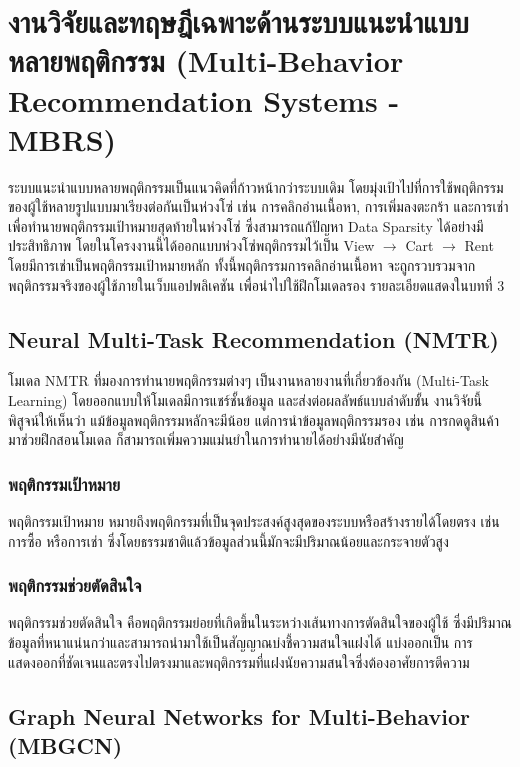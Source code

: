 \section{งานวิจัยและทฤษฎีเฉพาะด้านระบบแนะนำแบบหลายพฤติกรรม (Multi-Behavior Recommendation Systems - MBRS)}

ระบบแนะนำแบบหลายพฤติกรรมเป็นแนวคิดที่ก้าวหน้ากว่าระบบเดิม โดยมุ่งเป้าไปที่การใช้พฤติกรรมของผู้ใช้หลายรูปแบบมาเรียงต่อกันเป็นห่วงโซ่ เช่น การคลิกอ่านเนื้อหา, การเพิ่มลงตะกร้า และการเช่า เพื่อทำนายพฤติกรรมเป้าหมายสุดท้ายในห่วงโซ่ ซึ่งสามารถแก้ปัญหา Data Sparsity ได้อย่างมีประสิทธิภาพ โดยในโครงงานนี้ได้ออกแบบห่วงโซ่พฤติกรรมไว้เป็น View $\rightarrow$ Cart $\rightarrow$ Rent โดยมีการเช่าเป็นพฤติกรรมเป้าหมายหลัก ทั้งนี้พฤติกรรมการคลิกอ่านเนื้อหา จะถูกรวบรวมจากพฤติกรรมจริงของผู้ใช้ภายในเว็บแอปพลิเคชัน เพื่อนำไปใช้ฝึกโมเดลรอง รายละเอียดแสดงในบทที่ 3

\subsection{Neural Multi-Task Recommendation (NMTR)}

โมเดล NMTR ที่มองการทำนายพฤติกรรมต่างๆ เป็นงานหลายงานที่เกี่ยวข้องกัน (Multi-Task Learning) โดยออกแบบให้โมเดลมีการแชร์ชั้นข้อมูล และส่งต่อผลลัพธ์แบบลำดับขั้น งานวิจัยนี้พิสูจน์ให้เห็นว่า แม้ข้อมูลพฤติกรรมหลักจะมีน้อย แต่การนำข้อมูลพฤติกรรมรอง เช่น การกดดูสินค้า มาช่วยฝึกสอนโมเดล ก็สามารถเพิ่มความแม่นยำในการทำนายได้อย่างมีนัยสำคัญ \cite{gao2019} 


\subsubsection{พฤติกรรมเป้าหมาย}
พฤติกรรมเป้าหมาย หมายถึงพฤติกรรมที่เป็นจุดประสงค์สูงสุดของระบบหรือสร้างรายได้โดยตรง เช่น การซื้อ หรือการเช่า ซึ่งโดยธรรมชาติแล้วข้อมูลส่วนนี้มักจะมีปริมาณน้อยและกระจายตัวสูง

\subsubsection{พฤติกรรมช่วยตัดสินใจ}
พฤติกรรมช่วยตัดสินใจ คือพฤติกรรมย่อยที่เกิดขึ้นในระหว่างเส้นทางการตัดสินใจของผู้ใช้ ซึ่งมีปริมาณข้อมูลที่หนาแน่นกว่าและสามารถนำมาใช้เป็นสัญญาณบ่งชี้ความสนใจแฝงได้ แบ่งออกเป็น การแสดงออกที่ชัดเจนและตรงไปตรงมาและพฤติกรรมที่แฝงนัยความสนใจซึ่งต้องอาศัยการตีความ

\subsection{Graph Neural Networks for Multi-Behavior (MBGCN)}

